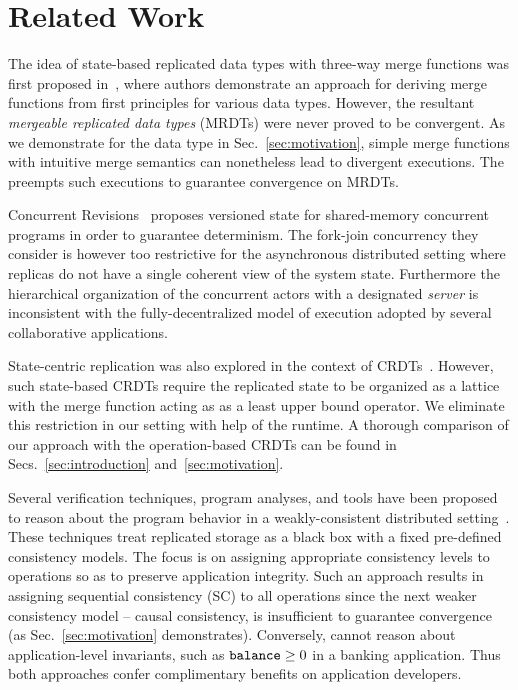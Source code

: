 \section{Related Work}
\label{sec:related}

The idea of state-based replicated data types with three-way merge
functions was first proposed in~\cite{mrdt}, where authors demonstrate
an approach for deriving merge functions from first principles for
various data types. However, the resultant \emph{mergeable replicated
data types} (MRDTs) were never proved to be convergent. As we
demonstrate for the  data type in Sec.~\ref{sec:motivation},
simple merge functions with intuitive merge semantics can nonetheless
lead to divergent executions. The \quark preempts such executions to
guarantee convergence on MRDTs.

Concurrent Revisions~\cite{BBL+10} proposes versioned state for
shared-memory concurrent programs in order to guarantee determinism.
The fork-join concurrency they consider is however too restrictive for
the asynchronous distributed setting where replicas do not have a
single coherent view of the system state.  Furthermore the
hierarchical organization of the concurrent actors with a designated
\emph{server} is inconsistent with the fully-decentralized model of
execution adopted by several collaborative applications.

State-centric replication was also explored in the context of
CRDTs~\cite{crdts}. However, such state-based CRDTs require the
replicated state to be organized as a lattice with the merge function
acting as as a least upper bound operator. We eliminate this
restriction in our setting with help of the \quark runtime. A thorough
comparison of our approach with the operation-based CRDTs can be found
in Secs.~\ref{sec:introduction} and~\ref{sec:motivation}.

Several verification techniques, program analyses, and tools have been
proposed to reason about the program behavior in a weakly-consistent
distributed setting~\cite{bailis-vldb, alvaro-calm,
gotsman-popl16,redblue-atc, redblue-osdi, ecinec}. These techniques
treat replicated storage as a black box with a fixed pre-defined
consistency models. The focus is on assigning appropriate consistency
levels to operations so as to preserve application integrity. Such an
approach results in assigning sequential consistency (SC) to all
operations since the next weaker consistency model -- causal
consistency, is insufficient to guarantee convergence (as
Sec.~\ref{sec:motivation} demonstrates). Conversely, \quark cannot
reason about application-level invariants, such as ${\tt balance}\ge 0$
in a banking application. Thus both approaches confer complimentary
benefits on application developers.

